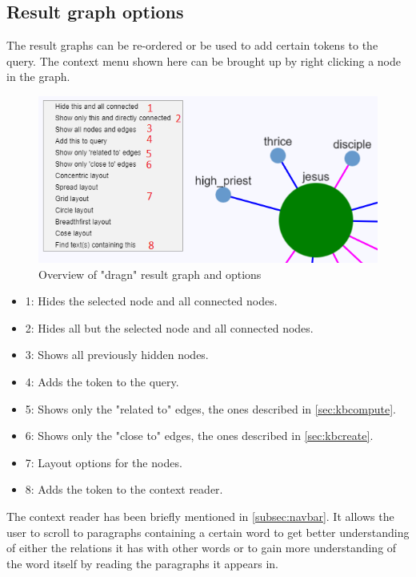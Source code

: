 \subsection{Result graph options}
The result graphs can be re-ordered or be used to add certain tokens to the query. The context menu shown here can be brought up by right clicking a node in the graph.
\begin{figure}[H]
    \centering
    \hspace*{-1,5cm}
    \includegraphics[scale=0.8]{fig/graph-interface}
    \caption{Overview of "dragn" result graph and options}
    \label{fig:graph-options}
\end{figure}
\begin{itemize}
    \item 1: Hides the selected node and all connected nodes.
    \item 2: Hides all but the selected node and all connected nodes.
    \item 3: Shows all previously hidden nodes.
    \item 4: Adds the token to the query.
    \item 5: Shows only the "related to" edges, the ones described in \ref{sec:kbcompute}.
    \item 6: Shows only the "close to" edges, the ones described in \ref{sec:kbcreate}.
    \item 7: Layout options for the nodes.
    \item 8: Adds the token to the context reader.
\end{itemize}
The context reader has been briefly mentioned in \ref{subsec:navbar}. It allows the user to scroll to paragraphs containing a certain word to get better understanding of either the relations it has with other words or to gain more understanding of the word itself by reading the paragraphs it appears in.


